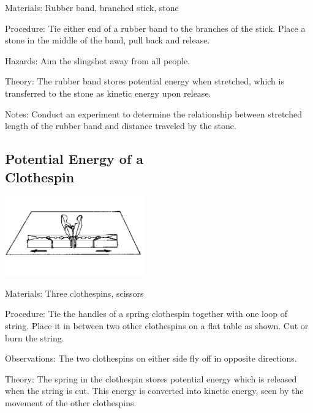 \begin{multicols}{2}
\begin{description*}
\item[Materials:]{Rubber band, branched stick, stone}
\item[Procedure:]{Tie either end of a rubber band to the branches of the stick. Place a stone in the middle of the band, pull back and release.}
\item[Hazards:]{Aim the slingshot away from all people.}
\item[Theory:]{The rubber band stores potential energy when stretched, which is transferred to the stone as kinetic energy upon release.}
\item[Notes:]{Conduct an experiment to determine the relationship between stretched length of the rubber band and distance traveled by the stone.}
\end{description*}

\subsection[Potential Energy of a Clothespin]{Potential Energy of a \hfill \\ Clothespin}

\begin{center}
\includegraphics[width=0.45\textwidth]{./img/source/energy-clothespin.png}
\end{center}

\begin{description*}
\item[Materials:]{Three clothespins, scissors}
\item[Procedure:]{Tie the handles of a spring clothespin together with one loop of string. Place it in between two other clothespins on a flat table as shown. Cut or burn the string.}
\item[Observations:]{The two clothespins on either side fly off in opposite directions.}
\item[Theory:]{The spring in the clothespin stores potential energy which is released when the string is cut. This energy is converted into kinetic energy, seen by the movement of the other clothespins.}
\end{description*}


\end{multicols}
